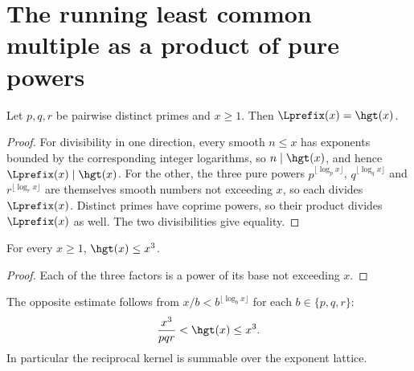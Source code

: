 
\section{The running least common multiple as a product of pure powers}\label{sec:lcm}

\begin{proposition}\label{res:lcm}
Let $p,q,r$ be pairwise distinct primes and $x\ge1$.  Then
$\Lprefix(x)=\hgt(x)$.
\end{proposition}

\begin{proof}
For divisibility in one direction, every smooth $n\le x$ has exponents bounded
by the corresponding integer logarithms, so $n\mid\hgt(x)$, and hence
$\Lprefix(x)\mid\hgt(x)$.  For the other, the three pure powers
$p^{\lfloor\log_p x\rfloor}$, $q^{\lfloor\log_q x\rfloor}$ and
$r^{\lfloor\log_r x\rfloor}$ are themselves smooth numbers not exceeding $x$,
so each divides $\Lprefix(x)$.  Distinct primes have coprime powers, so their
product divides $\Lprefix(x)$ as well.  The two divisibilities give equality.
\end{proof}

\begin{proposition}\label{res:cube}
For every $x\ge1$, $\hgt(x)\le x^{3}$.
\end{proposition}

\begin{proof}
Each of the three factors is a power of its base not exceeding $x$.
\end{proof}

The opposite estimate follows from
$x/b<b^{\lfloor\log_b x\rfloor}$ for each $b\in\{p,q,r\}$:
\[
 \frac{x^3}{pqr}<\hgt(x)\le x^3.
\]
In particular the reciprocal kernel is summable over the exponent lattice.
